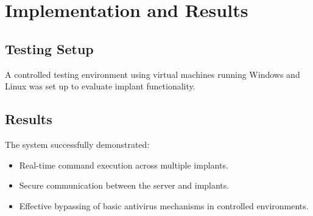 
\chapter{Implementation and Results}
\section{Testing Setup}
A controlled testing environment using virtual machines running Windows and Linux was set up to evaluate implant functionality.

\section{Results}
The system successfully demonstrated:
\begin{itemize}
    \item Real-time command execution across multiple implants.
    \item Secure communication between the server and implants.
    \item Effective bypassing of basic antivirus mechanisms in controlled environments.
\end{itemize}
